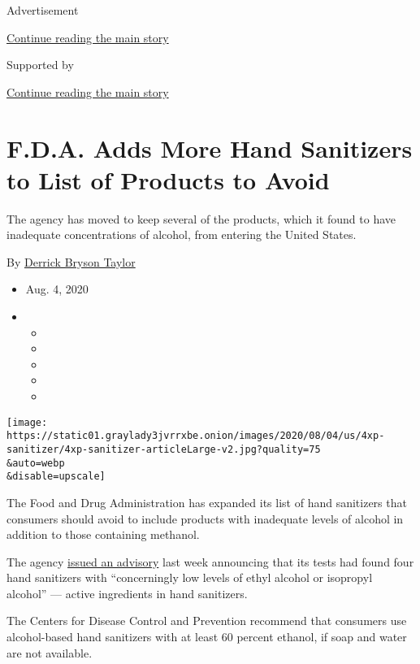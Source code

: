 Advertisement

\protect\hyperlink{after-top}{Continue reading the main story}

Supported by

\protect\hyperlink{after-sponsor}{Continue reading the main story}

\hypertarget{fda-adds-more-hand-sanitizers-to-list-of-products-to-avoid}{%
\section{F.D.A. Adds More Hand Sanitizers to List of Products to
Avoid}\label{fda-adds-more-hand-sanitizers-to-list-of-products-to-avoid}}

The agency has moved to keep several of the products, which it found to
have inadequate concentrations of alcohol, from entering the United
States.

By
\href{https://www.nytimes3xbfgragh.onion/by/derrick-bryson-taylor}{Derrick
Bryson Taylor}

\begin{itemize}
\item
  Aug. 4, 2020
\item
  \begin{itemize}
  \item
  \item
  \item
  \item
  \item
  \end{itemize}
\end{itemize}

\texttt{[image: https://static01.graylady3jvrrxbe.onion/images/2020/08/04/us/4xp-sanitizer/4xp-sanitizer-articleLarge-v2.jpg?quality=75\\\&auto=webp\\\&disable=upscale]}

The Food and Drug Administration has expanded its list of hand
sanitizers that consumers should avoid to include products with
inadequate levels of alcohol in addition to those containing methanol.

The agency
\href{https://www.fda.gov/drugs/drug-safety-and-availability/fda-updates-hand-sanitizers-consumers-should-not-use\#products}{issued
an advisory} last week announcing that its tests had found four hand
sanitizers with ``concerningly low levels of ethyl alcohol or isopropyl
alcohol'' --- active ingredients in hand sanitizers.

The Centers for Disease Control and Prevention recommend that consumers
use alcohol-based hand sanitizers with at least 60 percent ethanol, if
soap and water are not available.

